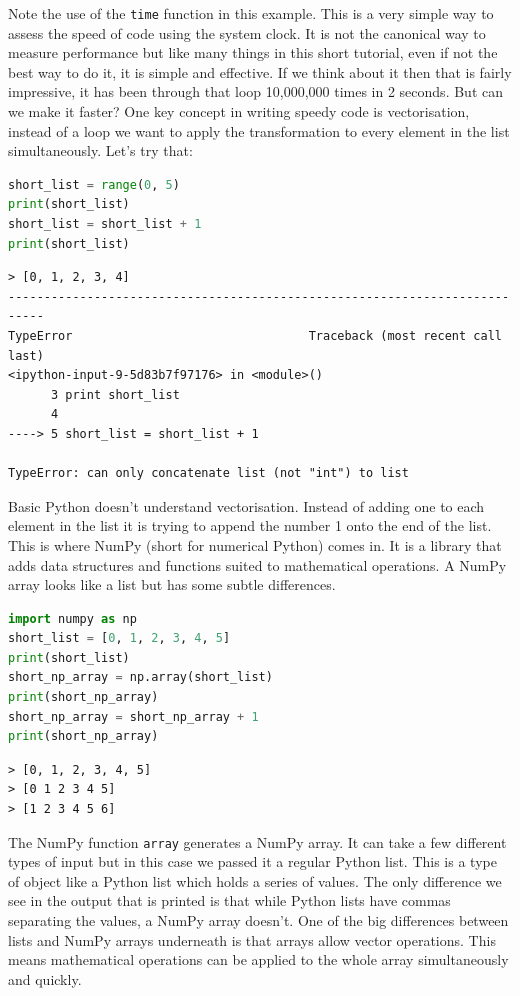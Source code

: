 	Note the use of the \texttt{time} function in this example. This is a very simple way to assess the speed of code using the system clock. It is not the canonical way to measure performance but like many things in this short tutorial, even if not the best way to do it, it is simple and effective.
	If we think about it then that is fairly impressive, it has been through that loop 10,000,000 times in 2 seconds. But can we make it faster? One key concept in writing speedy code is vectorisation, instead of a loop we want to apply the transformation to every element in the list simultaneously. Let's try that:

	\begin{lstlisting}[language=Python]
short_list = range(0, 5)
print(short_list)
short_list = short_list + 1
print(short_list)\end{lstlisting}

	\begin{verbatim}
> [0, 1, 2, 3, 4]
---------------------------------------------------------------------------
TypeError                                 Traceback (most recent call last)
<ipython-input-9-5d83b7f97176> in <module>()
      3 print short_list
      4 
----> 5 short_list = short_list + 1

TypeError: can only concatenate list (not "int") to list\end{verbatim}

	Basic Python doesn't understand vectorisation. Instead of adding one to each element in the list it is trying to append the number 1 onto the end of the list. This is where NumPy (short for numerical Python) comes in. It is a library that adds data structures and functions suited to mathematical operations. A NumPy array looks like a list but has some subtle differences.

	\begin{lstlisting}[language=Python]
import numpy as np
short_list = [0, 1, 2, 3, 4, 5]
print(short_list)
short_np_array = np.array(short_list)
print(short_np_array)
short_np_array = short_np_array + 1
print(short_np_array)\end{lstlisting}

	\begin{verbatim}
> [0, 1, 2, 3, 4, 5]
> [0 1 2 3 4 5]
> [1 2 3 4 5 6]
	\end{verbatim}

	The NumPy function \texttt{array} generates a NumPy array. It can take a few different types of input but in this case we passed it a regular Python list. This is a type of object like a Python list which holds a series of values. The only difference we see in the output that is printed is that while Python lists have commas separating the values, a NumPy array doesn't. One of the big differences between lists and NumPy arrays underneath is that arrays allow vector operations. This means mathematical operations can be applied to the whole array simultaneously and quickly.

